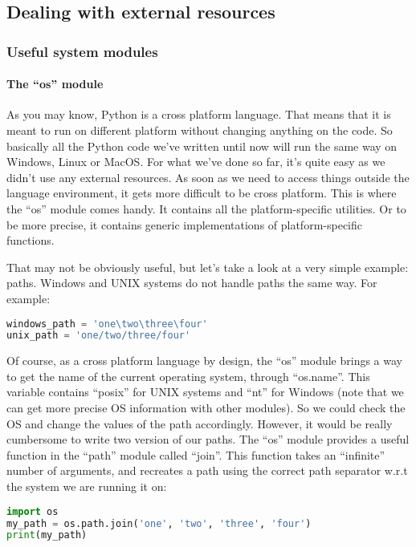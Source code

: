 \subsection{Dealing with external resources}
\subsubsection{Useful system modules}

\paragraph{The ``os'' module}
As you may know, Python is a cross platform language. That means that it
is meant to run on different platform without changing anything on the code.
So basically all the Python code we've written until now will run the same way
on Windows, Linux or MacOS. For what we've done so far, it's quite easy as we
didn't use any external resources. As soon as we need to access things outside
the language environment, it gets more difficult to be cross platform. This is
where the ``os'' module comes handy. It contains all the platform-specific utilities.
Or to be more precise, it contains generic implementations of platform-specific
functions.

\vspace{5mm}

That may not be obviously useful, but let's take a look at a very simple example:
paths. Windows and UNIX systems do not handle paths the same way. For example:

\begin{lstlisting}[language=python]
windows_path = 'one\two\three\four'
unix_path = 'one/two/three/four'
\end{lstlisting}

Of course, as a cross platform language by design, the ``os'' module brings
a way to get the name of the current operating system, through ``os.name''. This
variable contains ``posix'' for UNIX systems and ``nt'' for Windows (note that
we can get more precise OS information with other modules). So we could check the OS
and change the values of the path accordingly. However, it would be really
cumbersome to write two version of our paths. The ``os'' module
provides a useful function in the ``path'' module called ``join''. This function
takes an ``infinite'' number of arguments, and recreates a path using the correct
path separator w.r.t the system we are running it on:

\begin{lstlisting}[language=python]
import os
my_path = os.path.join('one', 'two', 'three', 'four')
print(my_path)
\end{lstlisting}

